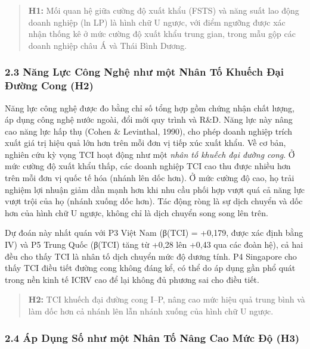 \documentclass[12pt,a4paper]{article}
\begin{document}
\begin{quote}
\textbf{H1:} Mối quan hệ giữa cường độ xuất khẩu (FSTS) và năng suất lao
động doanh nghiệp (ln LP) là hình chữ U ngược, với điểm ngưỡng được xác
nhận thống kê ở mức cường độ xuất khẩu trung gian, trong mẫu gộp các
doanh nghiệp châu Á và Thái Bình Dương.
\end{quote}

\hypertarget{23-nux103ng-lux1ef1c-cuxf4ng-nghux1ec7-nhux1b0-mux1ed9t-nhuxe2n-tux1ed1-khuux1ebfch-ux111ux1ea1i-ux111ux1b0ux1eddng-cong-h2}{%
\subsubsection{2.3 Năng Lực Công Nghệ như một Nhân Tố Khuếch Đại Đường
Cong
(H2)}\label{23-nux103ng-lux1ef1c-cuxf4ng-nghux1ec7-nhux1b0-mux1ed9t-nhuxe2n-tux1ed1-khuux1ebfch-ux111ux1ea1i-ux111ux1b0ux1eddng-cong-h2}}

Năng lực công nghệ được đo bằng chỉ số tổng hợp gồm chứng nhận chất
lượng, áp dụng công nghệ nước ngoài, đổi mới quy trình và R\&D. Năng lực
này nâng cao năng lực hấp thụ (Cohen \& Levinthal, 1990), cho phép doanh
nghiệp trích xuất giá trị hiệu quả lớn hơn trên mỗi đơn vị tiếp xúc xuất
khẩu. Về cơ bản, nghiên cứu kỳ vọng TCI hoạt động như một \emph{nhân tố
khuếch đại đường cong}. Ở mức cường độ xuất khẩu thấp, các doanh nghiệp
TCI cao thu được nhiều hơn trên mỗi đơn vị quốc tế hóa (nhánh lên dốc
hơn). Ở mức cường độ cao, họ trải nghiệm lợi nhuận giảm dần mạnh hơn khi
nhu cầu phối hợp vượt quá cả năng lực vượt trội của họ (nhánh xuống dốc
hơn). Tác động ròng là sự dịch chuyển và dốc hơn của hình chữ U ngược,
không chỉ là dịch chuyển song song lên trên.

Dự đoán này nhất quán với P3 Việt Nam (β(TCI) = +0,179, được xác định
bằng IV) và P5 Trung Quốc (β(TCI) tăng từ +0,28 lên +0,43 qua các đoàn
hệ), cả hai đều cho thấy TCI là nhân tố dịch chuyển mức độ dương tính.
P4 Singapore cho thấy TCI điều tiết đường cong không đáng kể, có thể do
áp dụng gần phổ quát trong nền kinh tế ICRV cao để lại không đủ phương
sai cho điều tiết.

\begin{quote}
\textbf{H2:} TCI khuếch đại đường cong I--P, nâng cao mức hiệu quả trung
bình và làm dốc hơn cả nhánh lên lẫn nhánh xuống của hình chữ U ngược.
\end{quote}

\hypertarget{24-uxe1p-dux1ee5ng-sux1ed1-nhux1b0-mux1ed9t-nhuxe2n-tux1ed1-nuxe2ng-cao-mux1ee9c-ux111ux1ed9-h3}{%
\subsubsection{2.4 Áp Dụng Số như một Nhân Tố Nâng Cao Mức Độ
(H3)}\label{24-uxe1p-dux1ee5ng-sux1ed1-nhux1b0-mux1ed9t-nhuxe2n-tux1ed1-nuxe2ng-cao-mux1ee9c-ux111ux1ed9-h3}}
\end{document}

